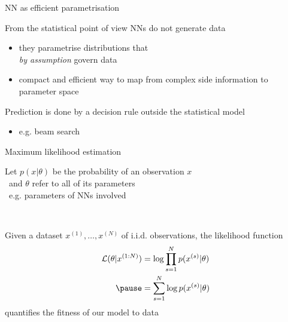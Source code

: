 \begin{comment}
\begin{frame}{Task-driven feature extraction}

Often our side information $\phi$ is itself some high dimensional data
\begin{itemize}
	\item $\phi$ is a sentence and $x$ a tree
	\item $\phi$ is the source sentence and $x$ is the target
	\item $\phi$ is an image and $x$ is a caption
\end{itemize}
and part of the job of the NNs that parametrise our models is to also \alert{deterministically} encode that input in a low-dimensional space

\end{frame}
\end{comment}


\begin{frame}{NN as efficient parametrisation}

From the statistical point of view NNs do not generate data\\
\begin{itemize}
	\item \alert{they parametrise distributions} that \\
	\emph{by assumption} govern data
	\item compact and efficient way to \alert{map from complex side information to parameter space}
\end{itemize}

\vspace{10pt}

\pause
Prediction is done by a decision rule outside the statistical model
\begin{itemize}
	\item e.g. beam search
\end{itemize}

\end{frame}

\begin{frame}{Maximum likelihood estimation}

Let $p(x|\theta)$ be the probability of an observation $x$\\
~and $\theta$ refer to all of its parameters \\
~e.g. parameters of NNs involved

~ \pause

Given a dataset $x^{(1)}, \ldots, x^{(N)}$ of i.i.d. observations, the likelihood function 
\begin{equation*}
\begin{aligned}
\mathcal L(\theta|x^{(1:N)}) &= \log \prod_{s=1}^N p(x^{(s)}|\theta) \\ \pause
 &= \sum_{s=1}^N \log p(x^{(s)}|\theta)
\end{aligned}
\end{equation*} \pause
quantifies the fitness of our model to data

\end{frame}

